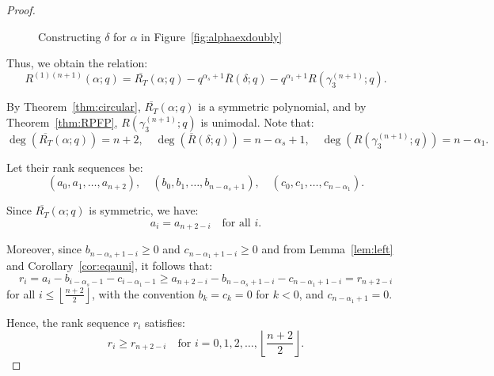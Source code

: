 \documentclass{article}
\theoremstyle{remark}
\begin{document}
\begin{proof}
\begin{figure}[H]
    \caption{Constructing $\delta$ for $\alpha$ in Figure~\ref{fig:alphaexdoubly}}
    \label{fig:deltadoubly}
\end{figure}


Thus, we obtain the relation:
\[
R^{(1)(n+1)}(\alpha; q) = \overline{R_T}(\alpha; q) - q^{\alpha_s + 1} \overline{R}(\delta; q) - q^{\alpha_1 + 1} R(\gamma_3^{(n+1)}; q).
\]

By Theorem~\ref{thm:circular}, \( \overline{R_T}(\alpha; q) \) is a symmetric polynomial, and by Theorem~\ref{thm:RPFP}, \( R(\gamma_3^{(n+1)}; q) \) is unimodal. Note that:
\[
\deg(\overline{R_T}(\alpha; q)) = n + 2, \quad \deg(\overline{R}(\delta; q)) = n - \alpha_s + 1, \quad \deg(R(\gamma_3^{(n+1)}; q)) = n - \alpha_1.
\]

Let their rank sequences be:
\[
(a_0, a_1, \ldots, a_{n+2}), \quad (b_0, b_1, \ldots, b_{n - \alpha_s + 1}), \quad (c_0, c_1, \ldots, c_{n - \alpha_1}).
\]

    Since \( \overline{R_T}(\alpha;q) \) is symmetric, we have:
    \[
    a_i = a_{n + 2 - i} \quad \text{for all } i.
    \]

    Moreover, since \( b_{n - \alpha_s + 1 - i} \geq 0 \) and \( c_{n - \alpha_1 + 1 - i} \geq 0 \) and from Lemma~\ref{lem:left} and Corollary~\ref{cor:eqauni}, it follows that:
    \[
    r_i = a_i - b_{i - \alpha_s - 1} - c_{i - \alpha_1 - 1} \geq a_{n + 2 - i} - b_{n - \alpha_s + 1 - i} - c_{n - \alpha_1 + 1 - i} = r_{n + 2 - i}
    \]
    for all \( i \leq \left\lfloor \frac{n+2}{2} \right\rfloor \), with the convention \( b_k = c_k = 0 \) for \( k < 0 \), and \( c_{n - \alpha_1 + 1} = 0 \).

    Hence, the rank sequence \( r_i \) satisfies:
    \[
    r_i \geq r_{n + 2 - i} \quad \text{for } i = 0,1, 2, \ldots, \left\lfloor \frac{n+2}{2} \right\rfloor.
    \]


\end{proof}
\end{document}
